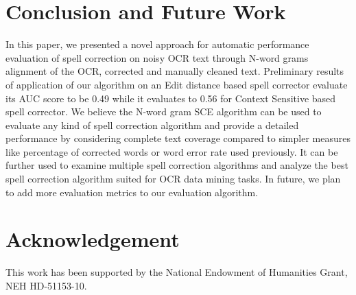\documentclass[preprint,11pt]{elsarticle}
\begin{document}
\section{Conclusion and Future Work}
\label{spell:fw}
In this paper, we presented a novel approach for automatic performance evaluation of spell correction on noisy OCR text through N-word grams alignment of the OCR, corrected and manually cleaned text. Preliminary results of application of our algorithm on an Edit distance based spell corrector evaluate its AUC score to be 0.49 while it evaluates to 0.56 for Context Sensitive based spell corrector. We believe the N-word gram SCE algorithm can be used to evaluate any kind of spell correction algorithm and provide a detailed performance by considering complete text coverage compared to simpler measures like percentage of corrected words or word error rate used previously. It can be further used to examine multiple spell correction algorithms and analyze the best spell correction algorithm suited for OCR data mining tasks.
In future, we plan to add more evaluation metrics to our evaluation algorithm.  


\section{Acknowledgement}
This work has been supported by the National Endowment of Humanities Grant, NEH HD-51153-10.






   
 





\end{document}
